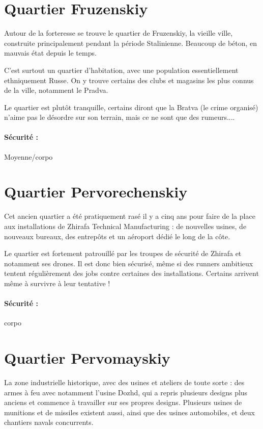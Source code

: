 \documentclass[10pt,a4paper]{book}
\begin{document}
\section{Quartier Fruzenskiy}
Autour de la forteresse se trouve le quartier de Fruzenskiy, la vieille ville, construite principalement pendant la période Stalinienne. Beaucoup de béton, en mauvais état depuis le temps.

C'est surtout un quartier d'habitation, avec une population essentiellement ethniquement Russe. On y trouve certains des clubs et magasins les plus connus de la ville, notamment le Pradva.

Le quartier est plutôt tranquille, certains diront que la Bratva (le crime organisé) n'aime pas le désordre sur son terrain, mais ce ne sont que des rumeurs....
\paragraph{Sécurité :}Moyenne/corpo
\section{Quartier Pervorechenskiy}
Cet ancien quartier a été pratiquement rasé il y a cinq ans pour faire de la place aux installations de Zhirafa Technical Manufacturing : de nouvelles usines, de nouveaux bureaux, des entrepôts et un aéroport dédié le long de la côte.

Le quartier est fortement patrouillé par les troupes de sécurité de Zhirafa et notamment ses drones. Il est donc bien sécurisé, même si des runners ambitieux tentent régulièrement des jobs contre certaines des installations. Certains arrivent même à survivre à leur tentative !
\paragraph{Sécurité :}corpo
\section{Quartier Pervomayskiy}
La zone industrielle historique, avec des usines et ateliers de toute sorte : des armes à feu avec notamment l'usine Dozhd, qui a repris plusieurs designs plus anciens et commence à travailler sur ses propres designs. Plusieurs usines de munitions et de missiles existent aussi, ainsi que des usines automobiles, et deux chantiers navals concurrents.
\end{document}
